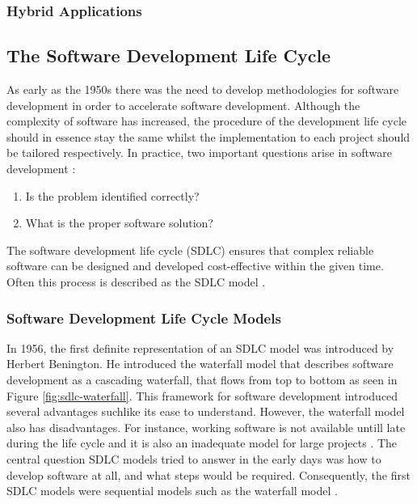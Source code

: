 \subsubsection{Hybrid Applications}


\subsection{The Software Development Life Cycle}
As early as the 1950s there was the need to develop methodologies for software development in order to accelerate software development. Although the complexity of software has increased, the procedure of the development life cycle should in essence stay the same whilst the implementation to each project should be tailored respectively. In practice, two important questions arise in software development \cite{langer2012guide}:
\begin{enumerate}
    \item Is the problem identified correctly?
    \item What is the proper software solution?
\end{enumerate}
The software development life cycle (SDLC) ensures that complex reliable software can be designed and developed cost-effective within the given time. Often this process is described as the SDLC model \cite{S_2017}.

\subsubsection{Software Development Life Cycle Models}

In 1956, the first definite representation of an SDLC model was introduced by Herbert Benington. He introduced the waterfall model that describes software development as a cascading waterfall, that flows from top to bottom as seen in Figure \ref{fig:sdlc-waterfall}. This framework for software development introduced several advantages suchlike its ease to understand. However, the waterfall model also has disadvantages. For instance, working software is not available untill late during the life cycle and it is also an inadequate model for large projects \cite{S_2017}. The central question SDLC models tried to answer in the early days was how to develop software at all, and what steps would be required. Consequently, the first SDLC models were sequential models such as the waterfall model \cite{Kneuper_2017}. 

